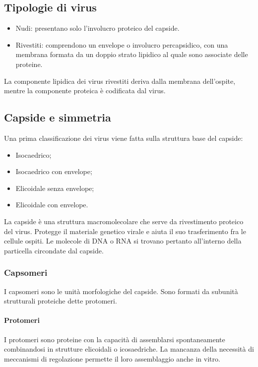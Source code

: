 	\subsection{Tipologie di virus}
	\begin{multicols}{2}
		\begin{itemize}
    			\item Nudi: presentano solo l'involucro proteico del capside.
			\item Rivestiti: comprendono un envelope o involucro percapsidico, con una membrana formata da un doppio strato lipidico al quale sono associate delle proteine. 
		\end{itemize}
	\end{multicols}
	La componente lipidica dei virus rivestiti deriva dalla membrana dell'ospite, mentre la componente proteica \`e codificata dal virus.

	\subsection{Capside e simmetria}
	Una prima classificazione dei virus viene fatta sulla struttura base del capside:
	\begin{multicols}{2}
		\begin{itemize}
		    \item Isocaedrico;
		    \item Isocaedrico con envelope;
		    \item Elicoidale senza envelope;
		    \item Elicoidale con envelope.
		\end{itemize}
	\end{multicols}
	La capside \`e una struttura macromolecolare che serve da rivestimento proteico del virus. 
	Protegge il materiale genetico virale e aiuta il suo trasferimento fra le cellule ospiti.
	Le molecole di DNA o RNA si trovano pertanto all'interno della particella circondate dal capside.

		\subsubsection{Capsomeri}
		I capsomeri sono le unit\`a morfologiche del capside.
		Sono formati da subunit\`a strutturali proteiche dette protomeri.

			\paragraph{Protomeri}
			I protomeri sono proteine con la capacit\`a di assemblarsi spontaneamente combinandosi in strutture elicoidali o icosaedriche.
			La mancanza della necessit\`a di meccanismi di regolazione permette il loro assemblaggio anche in vitro.


